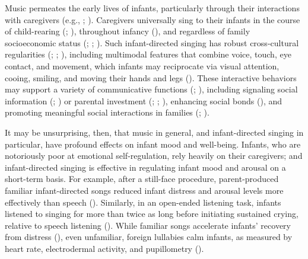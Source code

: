 \documentclass[
]{article}
\begin{document}
Music permeates the early lives of infants, particularly through their
interactions with caregivers (e.g., ; ).
Caregivers universally sing to their infants in the course of
child-rearing (;
), throughout infancy
(), and regardless of family
socioeconomic status (;
;
). Such
infant-directed singing has robust cross-cultural regularities
(;
;
), including multimodal
features that combine voice, touch, eye contact, and movement, which
infants may reciprocate via visual attention, cooing, smiling, and
moving their hands and legs (). These interactive behaviors may support a variety of
communicative functions (; ),
including signaling social information (; ) or parental
investment (;
;
), enhancing social bonds
(), and
promoting meaningful social interactions in families
(;
).

It may be unsurprising, then, that music in general, and infant-directed
singing in particular, have profound effects on infant mood and
well-being. Infants, who are notoriously poor at emotional
self-regulation, rely heavily on their caregivers; and infant-directed
singing is effective in regulating infant mood and arousal on a
short-term basis. For example, after a still-face procedure,
parent-produced familiar infant-directed songs reduced infant distress
and arousal levels more effectively than speech
(). Similarly, in an
open-ended listening task, infants listened to singing for more than
twice as long before initiating sustained crying, relative to speech
listening (). While
familiar songs accelerate infants' recovery from distress
(), even unfamiliar,
foreign lullabies calm infants, as measured by heart rate, electrodermal
activity, and pupillometry ().
\end{document}
